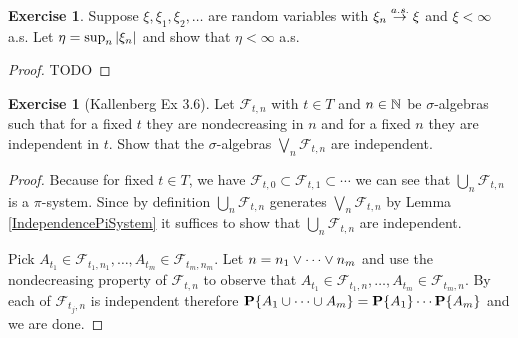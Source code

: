 \documentclass{amsart}
\theoremstyle{remark}
\theoremstyle{definition}
\newtheorem{ex}[thm]{Exercise}
\begin{document}
\begin{ex}Suppose $\xi, \xi_1, \xi_2, \dots$ are random variables with
  $\xi_n \overset{a.s.}\to \xi$ and $\xi < \infty$ a.s.  Let $\eta = \sup_n
  \left \vert \xi_n \right \vert$ and show that $\eta < \infty$ a.s.
\end{ex}
\begin{proof}
TODO
\end{proof}

\begin{ex}[Kallenberg Ex 3.6]Let $\mathcal{F}_{t,n}$ with $t \in T$ and $n \in \mathbb{N}$
  be $\sigma$-algebras such that for a fixed $t$ they are
  nondecreasing in $n$ and for a fixed $n$ they are independent in
  $t$.  Show that the $\sigma$-algebras $\bigvee_n \mathcal{F}_{t,n}$
  are independent.
\end{ex}
\begin{proof}
Because for fixed $t \in T$, we have $\mathcal{F}_{t,0} \subset
\mathcal{F}_{t,1} \subset \cdots$ we can see that $\bigcup_n
\mathcal{F}_{t,n}$ is a $\pi$-system.  Since by definition $\bigcup_n
\mathcal{F}_{t,n}$ generates $\bigvee_n
\mathcal{F}_{t,n}$ by Lemma \ref{IndependencePiSystem} it suffices to
show that $\bigcup_n \mathcal{F}_{t,n}$ are independent.

Pick $A_{t_1} \in \mathcal{F}_{t_1,n_1}, \dotsc, A_{t_m} \in
\mathcal{F}_{t_m,n_m}$. Let $n = n_1 \vee \dotsb \vee n_m$ and use
the nondecreasing property of $\mathcal{F}_{t,n}$ to observe that $A_{t_1} \in \mathcal{F}_{t_1,n}, \dotsc, A_{t_m} \in
\mathcal{F}_{t_m,n}$.  By each of $\mathcal{F}_{t_j,n}$ is independent
therefore $\textbf{P}\{A_1 \cup \dotsb \cup A_m\} = \textbf{P}\{A_1\}
\dotsm \textbf{P}\{A_m\}$ and we are done.
\end{proof}
\end{document}

